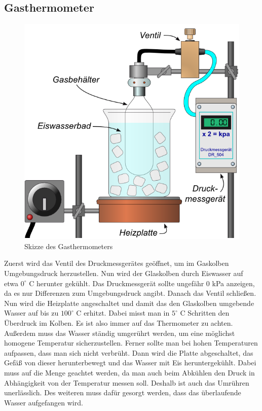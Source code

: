 \documentclass[12pt,a4paper,titlepage,headinclude,bibtotoc]{scrartcl}
\begin{document}
\subsection{Gasthermometer}
\begin{figure}[!htb]
 \centering
 \includegraphics{GasthermometerSkizze.jpg}
 \caption{Skizze des Gasthermometers \cite{lp}}
 \label{fig:GTSkizze}
\end{figure}

Zuerst wird das Ventil des Druckmessgerätes geöffnet, um im Gaskolben Umgebungsdruck herzustellen.
Nun wird der Glaskolben durch Eiswasser auf etwa $0^\circ$ C herunter gekühlt.
Das Druckmessgerät sollte ungefähr 0 kPa anzeigen, da es nur Differenzen zum Umgebungsdruck angibt. Danach das Ventil schließen.\\
Nun wird die Heizplatte angeschaltet und damit das den Glaskolben umgebende Wasser auf bis zu $100^\circ$ C erhitzt.
Dabei misst man in $5^\circ$ C Schritten den Überdruck im Kolben.
Es ist also immer auf das Thermometer zu achten.
Außerdem muss das Wasser ständig umgerührt werden, um eine möglichst homogene Temperatur sicherzustellen.
Ferner sollte man bei hohen Temperaturen aufpassen, dass man sich nicht verbrüht.
Dann wird die Platte abgeschaltet, das Gefäß von dieser herunterbewegt und das Wasser mit Eis heruntergekühlt.
Dabei muss auf die Menge geachtet werden, da man auch beim Abkühlen den Druck in Abhängigkeit von der Temperatur messen soll.
Deshalb ist auch das Umrühren unerlässlich.
Des weiteren muss dafür gesorgt werden, dass das überlaufende Wasser aufgefangen wird. 
\end{document}
